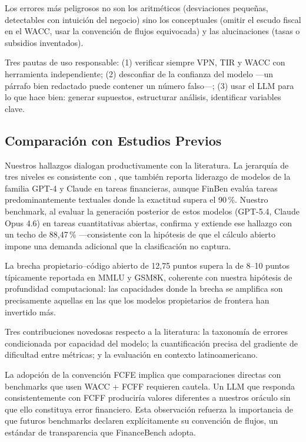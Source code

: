 \documentclass[12pt,a4paper]{article}
\begin{document}
Los errores más peligrosos no son los aritméticos (desviaciones pequeñas, detectables con intuición del negocio) sino los conceptuales (omitir el escudo fiscal en el WACC, usar la convención de flujos equivocada) y las alucinaciones (tasas o subsidios inventados).

Tres pautas de uso responsable: (1) verificar siempre VPN, TIR y WACC con herramienta independiente; (2) desconfiar de la confianza del modelo ---un párrafo bien redactado puede contener un número falso---; (3) usar el LLM para lo que hace bien: generar supuestos, estructurar análisis, identificar variables clave.

\subsection{Comparación con Estudios Previos}

Nuestros hallazgos dialogan productivamente con la literatura. La jerarquía de tres niveles es consistente con \citet{Xie2024}, que también reporta liderazgo de modelos de la familia GPT-4 y Claude en tareas financieras, aunque FinBen evalúa tareas predominantemente textuales donde la exactitud supera el 90\,\%. Nuestro benchmark, al evaluar la generación posterior de estos modelos (GPT-5.4, Claude Opus 4.6) en tareas cuantitativas abiertas, confirma y extiende ese hallazgo con un techo de 88,47\,\% ---consistente con la hipótesis de que el cálculo abierto impone una demanda adicional que la clasificación no captura.

La brecha propietario--código abierto de 12,75 puntos supera la de 8--10 puntos típicamente reportada en MMLU y GSM8K, coherente con nuestra hipótesis de profundidad computacional: las capacidades donde la brecha se amplifica son precisamente aquellas en las que los modelos propietarios de frontera han invertido más.

Tres contribuciones novedosas respecto a la literatura: la taxonomía de errores condicionada por capacidad del modelo; la cuantificación precisa del gradiente de dificultad entre métricas; y la evaluación en contexto latinoamericano.

La adopción de la convención FCFE implica que comparaciones directas con benchmarks que usen WACC + FCFF requieren cautela. Un LLM que responda consistentemente con FCFF produciría valores diferentes a nuestros oráculo sin que ello constituya error financiero. Esta observación refuerza la importancia de que futuros benchmarks declaren explícitamente su convención de flujos, un estándar de transparencia que FinanceBench adopta.
\end{document}
